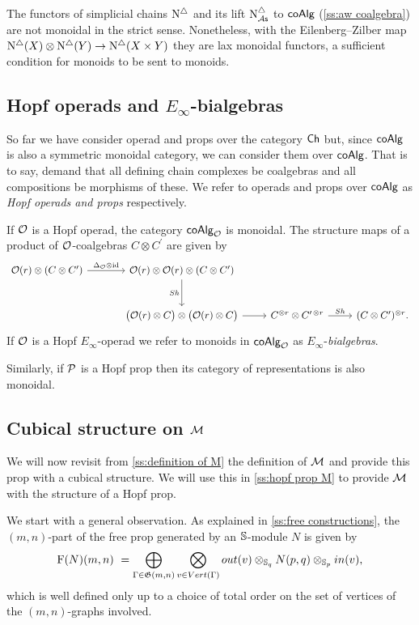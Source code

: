 The functors of simplicial chains $\schains$ and its lift $\schainsAs$ to $\coAlg$ (\cref{ss:aw coalgebra}) are not monoidal in the strict sense.
Nonetheless, with the Eilenberg--Zilber map $\schains(X) \otimes \schains(Y) \to \schains(X \times Y)$ they are lax monoidal functors, a sufficient condition for monoids to be sent to monoids.

\subsection{Hopf operads and $E_\infty$-bialgebras}

So far we have consider operad and props over the category $\Ch$ but, since $\coAlg$ is also a symmetric monoidal category, we can consider them over $\coAlg$.
That is to say, demand that all defining chain complexes be coalgebras and all compositions be morphisms of these.
We refer to operads and props over $\coAlg$ as \textit{Hopf operads and props} respectively.

If $\O$ is a Hopf operad, the category $\coAlg_\O$ is monoidal.
The structure maps of a product of $\O$-coalgebras $C \otimes C^\prime$ are given by
\[
\begin{tikzcd} [column sep = normal, row sep=large]
\O(r) \otimes (C \otimes C^\prime) \arrow[r, "\Delta_\O \otimes \id"] &[10 pt] \O(r) \otimes \O(r) \otimes (C \otimes C^\prime) \arrow[d, "Sh"'] & & \\ &
\big(\O(r) \otimes C \big) \otimes \big( \O(r) \otimes C \big) \arrow[r] & 
C^{\otimes r} \otimes C^{\prime\, \otimes r} \arrow[r, "Sh"] &
(C \otimes C^\prime)^{\otimes r}.
\end{tikzcd}
\]
If $\O$ is a Hopf $E_\infty$-operad we refer to monoids in $\coAlg_\O$ as $E_\infty$-\textit{bialgebras}.

Similarly, if $\P$ is a Hopf prop then its category of representations is also monoidal.

\subsection{Cubical structure on $\M$}

We will now revisit from \cref{ss:definition of M} the definition of $\M$ and provide this prop with a cubical structure.
We will use this in \cref{ss:hopf prop M} to provide $\M$ with the structure of a Hopf prop.

We start with a general observation.
As explained in \cref{ss:free constructions}, the $(m,n)$-part of the free prop generated by an $\S$-module $N$ is given by
\[
\F(N)(m,n) \ = \bigoplus_{\Gamma \in \G(m,n)} \bigotimes_{v \in Vert(\Gamma)} out(v) \otimes_{\S_q} N(p, q) \otimes_{\S_p} in(v),
\]
which is well defined only up to a choice of total order on the set of vertices of the $(m,n)$-graphs involved.

